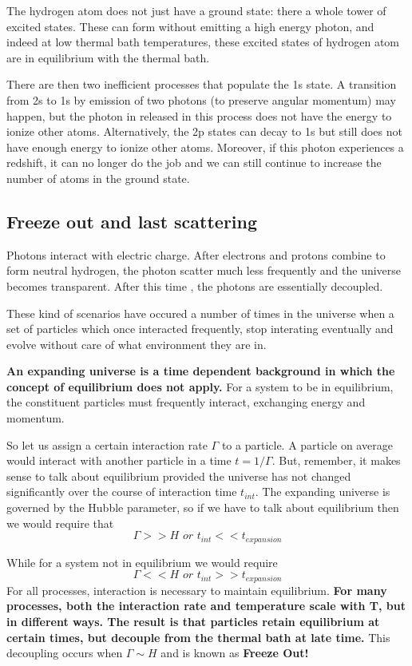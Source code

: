 \documentclass[12pt]{report}
\newcommand{\tbf}[1]{\textbf{#1}}
\newcommand{\tit}[1]{\textit{#1}}
\begin{document}
The hydrogen atom does not just have a ground state: there a whole tower of excited states. These can form without emitting a high energy photon, and indeed at low thermal bath temperatures, these excited states of hydrogen atom are in equilibrium with the thermal bath.

There are then two inefficient processes that populate the 1s state. A transition from 2s to 1s by emission of two photons (to preserve angular momentum) may happen, but the photon in released in this process does not have the energy to ionize other atoms. Alternatively, the 2p states can decay to 1s but still does not have enough energy to ionize other atoms. Moreover, if this photon experiences a redshift, it can no longer do the job and we can still continue to increase the number of atoms in the ground state.
\subsection{Freeze out and last scattering}
Photons interact with electric charge. After electrons and protons combine to form neutral hydrogen, the photon scatter much less frequently and the universe becomes transparent. After this time , the photons are essentially decoupled.

These kind of scenarios have occured a number of times in the universe when a set of particles which once interacted frequently, stop interating eventually and evolve without care of what environment they are in.

\tbf{An expanding universe is a time dependent background in which the concept of equilibrium does not apply. } For a system to be in equilibrium, the constituent particles must frequently interact, exchanging energy and momentum.

So let us assign a certain interaction rate $\Gamma$ to a particle. A particle on average would interact with another particle in a time $t=1/\Gamma$. But, remember, it makes sense to talk about equilibrium provided the universe has not changed significantly over the course of interaction time $t_{int}$. The expanding universe is governed by the Hubble parameter, so if we have to talk about equilibrium then we would require that 
\begin{equation}
\Gamma >> H \tit{  or  } t_{int}<<t_{expansion}
\end{equation}

While for a system not in equilibrium we would require
\begin{equation}
\Gamma << H \tit{  or  } t_{int}>>t_{expansion}
\end{equation}
For all processes, interaction is necessary to maintain equilibrium. \tbf{For many processes, both the interaction rate and temperature scale with T, but in different ways. The result is that particles retain equilibrium at certain times, but decouple from the thermal bath at late time. } This decoupling occurs when $\Gamma \sim H$ and is known as \tbf{Freeze Out!}
\end{document}
